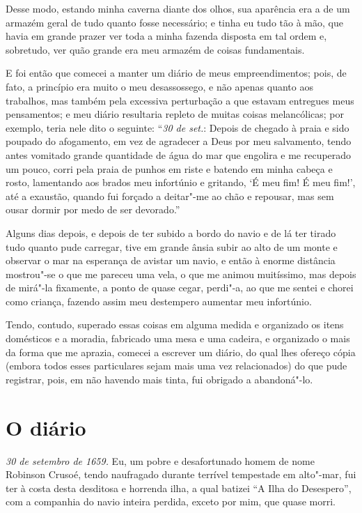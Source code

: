 Desse modo, estando minha caverna diante dos olhos, sua aparência era a
de um armazém geral de tudo quanto fosse necessário; e tinha eu tudo tão
à mão, que havia em grande prazer ver toda a minha fazenda disposta em
tal ordem e, sobretudo, ver quão grande era meu armazém de coisas
fundamentais.

E foi então que comecei a manter um diário de meus empreendimentos;
pois, de fato, a princípio era muito o meu desassossego, e não apenas
quanto aos trabalhos, mas também pela excessiva perturbação a que
estavam entregues meus pensamentos; e meu diário resultaria repleto de
muitas coisas melancólicas; por exemplo, teria nele dito o seguinte:
``\emph{30 de set.}: Depois de chegado à praia e sido poupado do
afogamento, em vez de agradecer a Deus por meu salvamento, tendo antes
vomitado grande quantidade de água do mar que engolira e me recuperado
um pouco, corri pela praia de punhos em riste e batendo em minha cabeça
e rosto, lamentando aos brados meu infortúnio e gritando, `É meu fim! É
meu fim!', até a exaustão, quando fui forçado a deitar"-me ao chão e
repousar, mas sem ousar dormir por medo de ser devorado.''

Alguns dias depois, e depois de ter subido a bordo do navio e de lá ter
tirado tudo quanto pude carregar, tive em grande ânsia subir ao alto de
um monte e observar o mar na esperança de avistar um navio, e então à
enorme distância mostrou"-se o que me pareceu uma vela, o que me animou
muitíssimo, mas depois de mirá"-la fixamente, a ponto de quase cegar,
perdi"-a, ao que me sentei e chorei como criança, fazendo assim meu
destempero aumentar meu infortúnio.

Tendo, contudo, superado essas coisas em alguma medida e organizado os
itens domésticos e a moradia, fabricado uma mesa e uma cadeira, e
organizado o mais da forma que me aprazia, comecei a escrever um diário,
do qual lhes ofereço cópia (embora todos esses particulares sejam mais
uma vez relacionados) do que pude registrar, pois, em não havendo mais
tinta, fui obrigado a abandoná"-lo.

\chapter{O diário}

\emph{30 de setembro de 1659.} Eu, um pobre e desafortunado homem de
nome Robinson Crusoé, tendo naufragado durante terrível tempestade em
alto"-mar, fui ter à costa desta desditosa e horrenda ilha, a qual
batizei ``A Ilha do Desespero'', com a companhia do navio inteira
perdida, exceto por mim, que quase morri.

